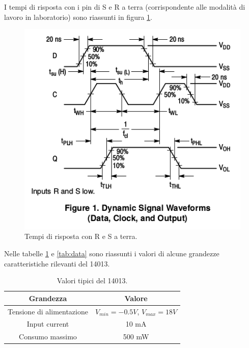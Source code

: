 \documentclass[journal, a4paper]{IEEEtran}
\begin{document}
I tempi di risposta con i pin di S e R a terra (corrispondente alle modalità di lavoro in laboratorio) sono riassunti in figura \ref{fig:time}.

\begin{figure}[htp]
\centering
\includegraphics[scale=.4]{time}
\caption{Tempi di risposta con R e S a terra.}
\label{fig:time}
\end{figure}

Nelle tabelle \ref{tab:val} e \ref{tab:data} sono riassunti i valori di alcune grandezze caratteristiche rilevanti del 14013.

\begin{table}[htp]
\centering
\caption{Valori tipici del 14013.}
\label{tab:val}
\begin{tabular}{|c|c|}
\hline 
Grandezza & Valore \\ 
\hline 
Tensione di alimentazione & $V_{min} = -0.5 V$, $V_{max} = 18 V$ \\ 
\hline 
Input current & 10 mA \\ 
\hline 
Consumo massimo & 500 mW \\ 
\hline 
\end{tabular} 
\end{table}
\end{document}
